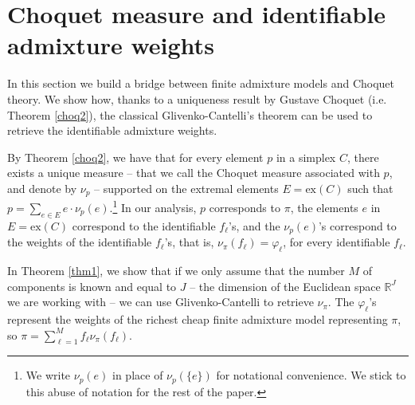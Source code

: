 \documentclass[12pt, reqno]{amsart}
\theoremstyle{definition}
\begin{document}
\section{Choquet measure and identifiable admixture weights}\label{choq}

In this section we build a bridge between finite admixture models and Choquet theory. We show how, thanks to a uniqueness result by Gustave Choquet (i.e. Theorem \ref{choq2}), the classical Glivenko-Cantelli's theorem can be used to retrieve the identifiable admixture weights. 



By Theorem \ref{choq2}, we have that for every element $p$ in a simplex $C$, there exists a unique measure -- that we call the Choquet measure associated with $p$, and denote by $\nu_p$ -- supported on the extremal elements $E=\text{ex}(C)$ such that $p=\sum_{e \in E} e \cdot \nu_p(e)$.\footnote{We write $\nu_p(e)$ in place of $\nu_p(\{e\})$ for notational convenience. We stick to this abuse of notation for the rest of the paper.} In our analysis, $p$ corresponds to $\pi$, the elements $e$ in $E=\text{ex}(C)$ correspond to the identifiable $f_\ell$'s, and the $\nu_p(e)$'s correspond to the weights of the identifiable $f_\ell$'s, that is, $\nu_{\pi}(f_\ell)=\varphi_{\ell}$, for every identifiable $f_\ell$.

In Theorem \ref{thm1}, we show that if we only assume that the number $M$ of components is known and equal to $J$ -- the dimension of the Euclidean space $\mathbb{R}^J$ we are working with -- we can use Glivenko-Cantelli to retrieve $\nu_{\pi}$. The $\varphi_{\ell}$'s represent the weights of the richest cheap finite admixture model representing $\pi$, 
so $\pi=\sum_{\ell=1}^M f_\ell \nu_{\pi}(f_\ell)$. 
\end{document}
